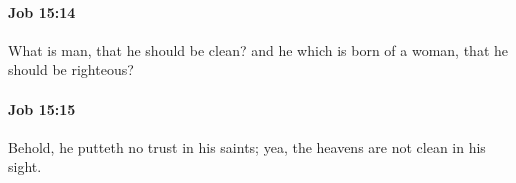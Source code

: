 		\paragraph{Job 15:14} %
			\label{JOB-15-14}

			What is man, that he should be clean? and he which is born of a woman, that he should be righteous?


		\paragraph{Job 15:15} %
			\label{JOB-15-15}

			Behold, he putteth no trust in his saints; yea, the heavens are not clean in his sight.


